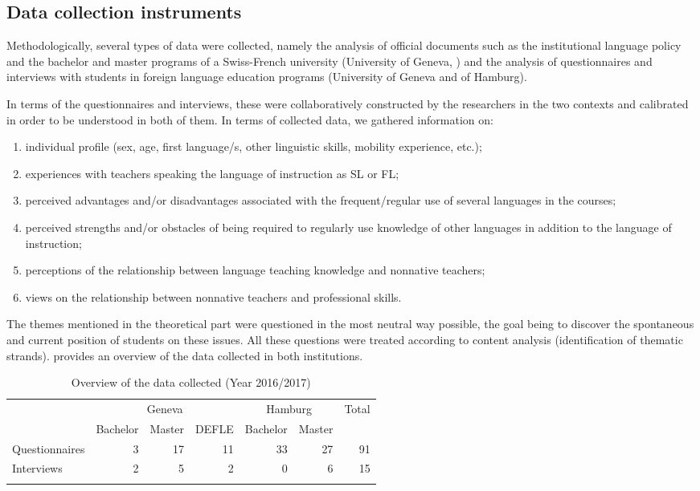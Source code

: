 \documentclass[output=paper]{../langscibook}
\begin{document}
\subsection{Data collection instruments}
Methodologically, several types of data were collected, namely the analysis of official documents such as the institutional language policy and the bachelor and master programs of a Swiss-French university (University of Geneva, \citealt{Yanaprasart2020}) and the analysis of questionnaires and interviews with students in foreign language education programs (University of Geneva and of Hamburg). 

In terms of the questionnaires and interviews, these were collaboratively constructed by the researchers in the two contexts and calibrated in order to be understood in both of them. In terms of collected data, we gathered information on: 

\begin{enumerate}[noitemsep]
\item individual profile (sex, age, first language/s, other linguistic skills, mobility experience, etc.); 
\item experiences with teachers speaking the language of instruction as SL or FL; 
\item perceived advantages and\slash or disadvantages associated with the frequent\slash regular use of several languages in the courses; 
\item perceived strengths and\slash or obstacles of being required to regularly use knowledge of other languages in addition to the language of instruction; 
\item perceptions of the relationship between language teaching knowledge and nonnative teachers; 
\item views on the relationship between nonnative teachers and professional skills. 
\end{enumerate}

\noindent The themes mentioned in the theoretical part were questioned in the most neutral way possible, the goal being to discover the spontaneous and current position of students on these issues. All these questions were treated according to content analysis (identification of thematic strands).  provides an overview of the data collected in both institutions.

\begin{table}
\begin{tabular}{l rrr rr r}
\lsptoprule
 & \multicolumn{3}{c}{Geneva} & \multicolumn{2}{c}{Hamburg} & Total\\\cmidrule(lr){2-4}\cmidrule(lr){5-6}
 & Bachelor & Master & DEFLE & Bachelor & Master & \\\midrule
Questionnaires & 3 & 17 & 11 & 33 & 27 & 91\\
Interviews     & 2 & 5 & 2 & 0 & 6 & 15\\
\lspbottomrule
\end{tabular}
\caption{Overview of the data collected (Year 2016/2017)\label{tab:9:1}}
\end{table}
\end{document}
